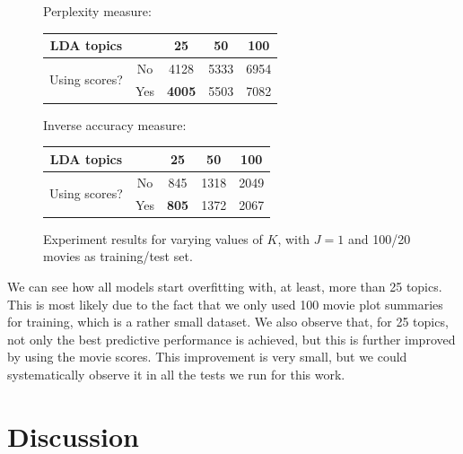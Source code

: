 \documentclass[a4paper,10pt]{article}
\begin{document}
\begin{figure}[ht!]
	Perplexity measure:
	
	\begin{center}
	\begin{tabular}{cc|ccc}
		LDA topics      & & 25 & 50 & 100 \\ \hline
		\multirow{2}{*}{Using scores?} & No  & 4128 & 5333 & 6954 \\
		                               & Yes & \textbf{4005} & 5503 & 7082 \\
	\end{tabular}
	\end{center}
	
	Inverse accuracy measure:
	
	\begin{center}
	\begin{tabular}{cc|ccc}
		LDA topics      & & 25 & 50 & 100 \\ \hline
		\multirow{2}{*}{Using scores?} & No  & 845 & 1318 & 2049 \\
		                               & Yes & \textbf{805} & 1372 & 2067 \\
	\end{tabular}
	\end{center}
\caption{Experiment results for varying values of $K$, with $J=1$ and 100/20 movies as training/test set.}
\label{figure:K}
\end{figure}

We can see how all models start overfitting with, at least, more than 25 topics.
This is most likely due to the fact that we only used 100 movie plot summaries for training, which is a rather small dataset. 
We also observe that, for 25 topics, not only the best predictive performance is achieved, but this is further improved by using the movie scores.
This improvement is very small, but we could systematically observe it in all the tests we run for this work. 

\section{Discussion}
\label{sec:discussion}
\end{document}
